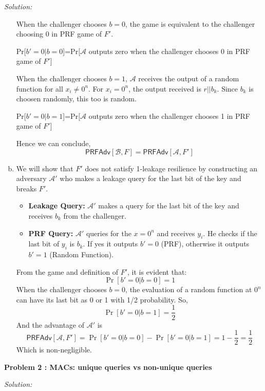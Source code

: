\documentclass[a4paper, 11pt]{article}
\newenvironment{solution}
    {\textit{Solution:}}
    {\clearpage}
\newcommand{\prob}[1]{\begin{mdframed}[backgroundcolor=gray!20] \textbf{Problem #1}\end{mdframed}}
\newcommand{\prf}{\mathsf{PRFAdv}}
\newcommand{\calA}{\mathcal{A}}
\newcommand{\calB}{\mathcal{B}}
\begin{document}
\begin{solution}
\begin{enumerate}[(a)]
        When the challenger chooses $b=0$, the game is equivalent to the challenger choosing 0 in PRF game of $F'$. 
        \begin{center}
            Pr[$b'=0|b=0$]=Pr[$\calA$ outputs zero when the challenger chooses 0 in PRF game of $F'$]
        \end{center}
        When the challenger chooses $b=1$, $\calA$ receives the output of a random function for all $x_i\neq0^n$. For $x_i=0^n$, the output received is $r||b_k$. Since $b_k$ is choosen randomly, this too is random.
        \begin{center}
            Pr[$b'=0|b=1$]=Pr[$\calA$ outputs zero when the challenger chooses 1 in PRF game of $F'$]
        \end{center}
        Hence we can conclude,
        $$\prf[\calB,F]=\prf[\calA,F']$$

        \item We will show that $F'$ does not satisfy 1-leakage resilience by constructing an adversary $\calA'$ who makes a leakage query for the last bit of the key and breaks $F'$.
        \begin{itemize}
            \item \textbf{Leakage Query:} $\calA'$ makes a query for the last bit of the key and receives $b_k$ from the challenger.
            \item \textbf{PRF Query:} $\calA'$ queries for the $x=0^n$ and receives $y_i$. He checks if the last bit of $y_i$ is $b_k$. If yes it outputs $b'=0$ (PRF), otherwise it outputs $b'=1$ (Random Function). 
        \end{itemize}
        From the game and definition of $F'$, it is evident that:
        $$\Pr[b'=0|b=0]=1$$
        When the challenger chooses $b=0$, the evaluation of a random function at $0^n$ can have its last bit as 0 or 1 with 1/2 probability. So,
        $$\Pr[b'=0|b=1]=\frac12$$
        And the advantage of $\calA'$ is
        $$\prf[\calA,F']=\Pr[b'=0|b=0]-\Pr[b'=0|b=1]=1-\frac12=\frac12$$
        Which is non-negligible.
    \end{enumerate}
\end{solution}


\prob{2 : MACs: unique queries vs non-unique queries}
\begin{solution}
    
\end{solution}
\end{document}
